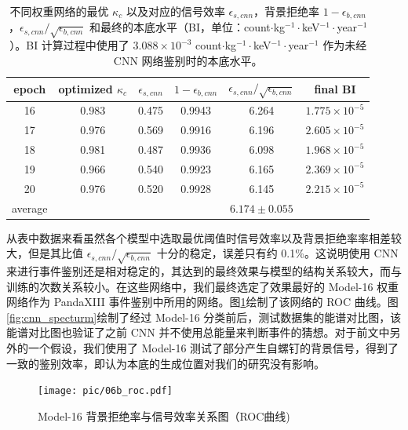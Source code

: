 \begin{table}
    \centering
    \caption{不同权重网络的最优 $\kappa_c$ 以及对应的信号效率 $\epsilon_{s,cnn}$，背景拒绝率 $1-\epsilon_{b,cnn}$，$\epsilon_{s,cnn}/\sqrt{\epsilon_{b,cnn}}$ 和最终的本底水平（BI，单位：count$\cdot$kg$^{-1}\cdot$keV$^{-1}\cdot$year$^{-1}$）。BI 计算过程中使用了 $3.088\times10^{-3}$ count$\cdot$kg$^{-1}\cdot$keV$^{-1}\cdot$year$^{-1}$ 作为未经 CNN 网络鉴别时的本底水平。}
    \begin{tabular}{cccccc}
      \\\hline
      epoch & optimized $\kappa_c$ & $\epsilon_{s,cnn}$ & $ 1-\epsilon_{b,cnn}$ &$\epsilon_{s,cnn}/\sqrt{\epsilon_{b,cnn}}$ & final BI\\\hline
      16 & 0.983 & 0.475 & 0.9943 & 6.264 & $1.775\times10^{-5}$ \\
      17 & 0.976 & 0.569 & 0.9916 & 6.196 & $2.605\times10^{-5}$ \\
      18 & 0.981 & 0.487 & 0.9936 & 6.098 & $1.968\times10^{-5}$ \\
      19 & 0.966 & 0.540 & 0.9923 & 6.165 & $2.369\times10^{-5}$ \\
      20 & 0.976 & 0.520 & 0.9928 & 6.145 & $2.215\times10^{-5}$ \\\hline
      average &  &  &  & $6.174\pm0.055$ \\\hline
    \end{tabular}
    \label{tab:efficiencies}
  \end{table}
  
从表中数据来看虽然各个模型中选取最优阈值时信号效率以及背景拒绝率率相差较大，但是其比值 $\epsilon_{s,cnn}/\sqrt{\epsilon_{b,cnn}}$ 十分的稳定，误差只有约 0.1\%。这说明使用 CNN 来进行事件鉴别还是相对稳定的，其达到的最终效果与模型的结构关系较大，而与训练的次数关系较小。在这些网络中，我们最终选定了效果最好的 Model-16 权重网络作为 PandaXIII 事件鉴别中所用的网络。图\ref{fig:cnn_roc}绘制了该网络的 ROC 曲线。图\ref{fig:cnn_specturm}绘制了经过 Model-16 分类前后，测试数据集的能谱对比图，该能谱对比图也验证了之前 CNN 并不使用总能量来判断事件的猜想。对于前文中另外的一个假设，我们使用了 Model-16 测试了部分产生自螺钉的背景信号，得到了一致的鉴别效率，即认为本底的生成位置对我们的研究没有影响。

\begin{figure}
    \centering
    \texttt{[image: pic/06b\_roc.pdf]}
    \caption{Model-16 背景拒绝率与信号效率关系图（ROC曲线)}
    \label{fig:cnn_roc}
\end{figure}

